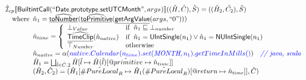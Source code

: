 \documentclass{article}
\makeatletter
\newcommand{\SF}[1]{\mbox{\textsf{#1}}}
\newcommand{\comment}[1]{\textit{#1}}
\newcommand{\wherec}[1]{{\rm where}\begin{array}[t]{l}#1\end{array}}
\newcommand{\ifc}[1]{{\rm if}\begin{array}[t]{l}#1\end{array}}
\newcommand{\owc}{{\rm otherwise}}
\newcommand{\aI}{\hat{\mathcal{I}}}
\newcommand{\lbr}{\llbracket}
\newcommand{\rbr}{\rrbracket}
\newcommand{\hf}[1]{\underline{\sf #1}}
\newcommand{\ahf}[1]{\widehat{\underline{\sf #1}}}
\newcommand{\varprop}[1]{@#1}
\newcommand{\avarloc}[1]{\hat{\##1}}
\newcommand{\avarprop}[1]{\hat{@#1}}
\def\inblue{\color{blue}}
\def\inblue{\color{blue}}
\makeatother
\begin{document}
\[\begin{array}{l}
\aI _{cp}\lbr \SF{BuiltintCall}(``\SF{Date.prototype.setUTCMonth}",args_{})\rbr((\hat{H},\hat{C}), \hat{S})
  = ((\hat{H}_2, \hat{C_2}), \hat{S})\\
\quad\wherec{
  \hat{n}_{1} = \ahf{toNumber}(\ahf{toPrimitive}(\hf{getArgValue}(args, ``0")))\\
  \hat{n}_{time} = \left\{\begin{array}{ll}
      \bot_{Value} & \ifc{\hat{n}_{1} \sqsubseteq  \bot_{number}}\\
      \ahf{TimeClip}(\hat{n}_{native})
      & \ifc{\hat{n}_{1} = \SF{UIntSingle}(n_{1}) \lor \hat{n}_{1} = \SF{NUIntSingle}(n_{1}) }\\
      \top_{Number} & \owc
    \end{array}\right.\\
  \hat{n}_{naitve} = \alpha({\inblue native.Calendar(n_{time}).set(\emph{MONTH}, n_{1}).getTimeInMills()})
    \quad\comment{{\inblue // java, scala}}\\  
  \hat{H}_1 = \bigsqcup_{\hat{l} \in \hat{C}.2} \hat{H}[\hat{l}
    \mapsto \hat{H}(\hat{l})[\avarprop{primitive} \mapsto \hat{n}_{time}]]\\
  (\hat{H}_2, \hat{C}_2) = 
    (\hat{H}_1[\avarloc{PureLocal}_R \mapsto \hat{H}_1(\avarloc{PureLocal}_R)
      [\varprop{return} \mapsto \hat{n}_{time}]], \hat{C})\\
  }\\
\\\\
\end{array}
\]
\end{document}
